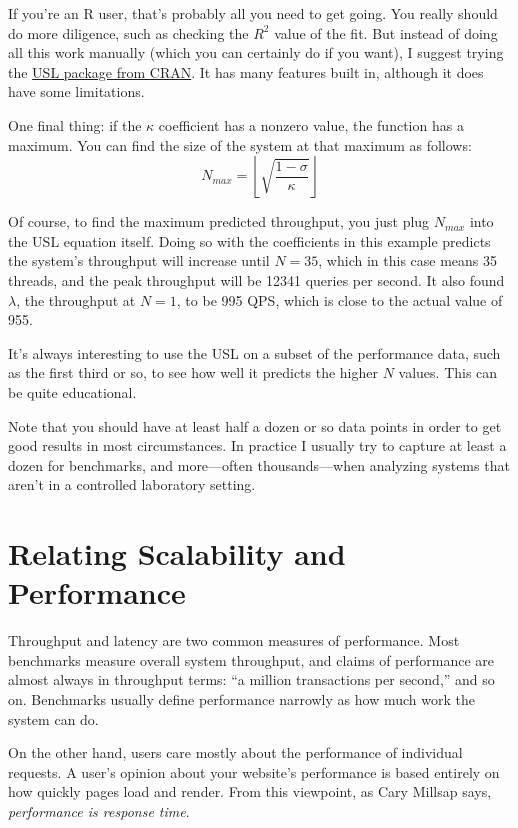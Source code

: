 \documentclass{vivid_layout}
\begin{document}
If you're an R user, that's probably all you need to get going. You really
should do more diligence, such as checking the $R^2$ value of the fit. But
instead of doing all this work manually (which you can certainly do if you
want), I suggest trying the
\href{https://cran.r-project.org/web/packages/usl/}{USL package from CRAN}. It
has many features built in, although it does have some limitations.

One final thing: if the $\kappa$ coefficient has a nonzero value, the function
has a maximum. You can find the size of the system at that maximum as follows:
\[
N_{max} = \left \lfloor \sqrt{\frac{1-\sigma}{\kappa}} \right \rfloor
\]

Of course, to find the maximum predicted throughput, you just plug $N_{max}$
into the USL equation itself. Doing so with the coefficients in this example
predicts the system's throughput will increase until $N=35$, which in this case
means 35 threads, and the peak throughput will be 12341 queries per second. It
also found $\lambda$, the throughput at $N=1$, to be 995 QPS, which is close to
the actual value of 955.

It's always interesting to use the USL on a subset of the performance data, such
as the first third or so, to see how well it predicts the higher $N$ values.
This can be quite educational.

Note that you should have at least half a dozen or so data points in order to
get good results in most circumstances. In practice I usually try to capture at
least a dozen for benchmarks, and more---often thousands---when analyzing
systems that aren't in a controlled laboratory setting.

\section{Relating Scalability and Performance}

Throughput and latency are two common measures of performance. Most benchmarks
measure overall system throughput, and claims of performance are almost always
in throughput terms: ``a million transactions per second,'' and so on.
Benchmarks usually define performance narrowly as how much work the system can
do.

On the other hand, users care mostly about the performance of individual
requests. A user's opinion about your website's performance is based entirely on
how quickly pages load and render.  From this viewpoint, as Cary Millsap says,
{\itshape performance is response time}.
\end{document}
